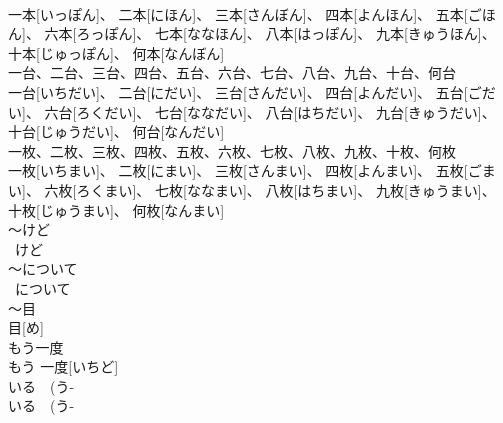\documentclass[8pt]{extreport}
\begin{document}
\begin{CJK}{UTF8}{min}
\\	一本[いっぽん]、 二本[にほん]、 三本[さんぼん]、 四本[よんほん]、 五本[ごほん]、 六本[ろっぽん]、 七本[ななほん]、 八本[はっぽん]、 九本[きゅうほん]、 十本[じゅっぽん]、 何本[なんぼん]
\\	一台、二台、三台、四台、五台、六台、七台、八台、九台、十台、何台	
\\	一台[いちだい]、 二台[にだい]、 三台[さんだい]、 四台[よんだい]、 五台[ごだい]、 六台[ろくだい]、 七台[ななだい]、 八台[はちだい]、 九台[きゅうだい]、 十台[じゅうだい]、 何台[なんだい]
\\	一枚、二枚、三枚、四枚、五枚、六枚、七枚、八枚、九枚、十枚、何枚	
\\	一枚[いちまい]、 二枚[にまい]、 三枚[さんまい]、 四枚[よんまい]、 五枚[ごまい]、 六枚[ろくまい]、 七枚[ななまい]、 八枚[はちまい]、 九枚[きゅうまい]、 十枚[じゅうまい]、 何枚[なんまい]
\\	～けど	
\\	~けど
\\	～について	
\\	~について
\\	～目	
\\	目[め]
\\	もう一度	
\\	もう 一度[いちど]
\\	いる　(う-
\\	いる　(う- 
\end{CJK}
\end{document}
